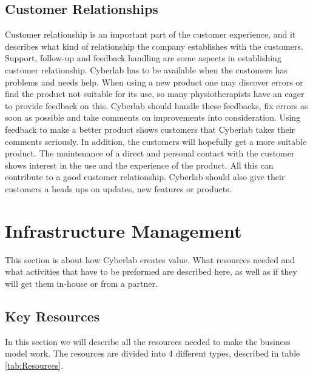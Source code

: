 \subsection{Customer Relationships}
Customer relationship is an important part of the customer experience, and it describes what kind of relationship the company establishes with the customers. Support, follow-up and feedback handling are some aspects in establishing customer relationship. Cyberlab has to be available when the customers has problems and needs help. When using a new product one may discover errors or find the product not suitable for its use, so many physiotherapists have an eager to provide feedback on this. Cyberlab should handle these feedbacks, fix errors as soon as possible and take comments on improvements into consideration. Using feedback to make a better product shows customers that Cyberlab takes their comments seriously.  In addition, the customers will hopefully get a more suitable product. The maintenance of a direct and personal contact with the customer shows interest in the use and the experience of the product. All this can contribute to a good customer relationship. Cyberlab should also give their customers a heads ups on updates, new features or products.
\section{Infrastructure Management}
This section is about how Cyberlab creates value. What resources needed and what activities that have to be preformed are described here, as well as if they will get them in-house or from a partner. 

\subsection{Key Resources}

In this section we will describe all the resources needed to make the business model work. The resources are divided into 4 different types, described in table \ref{tab:Resources}.
\newpage

